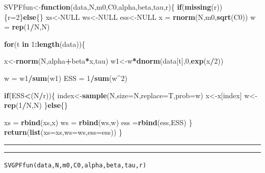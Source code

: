 \documentclass[
]{book}
\newenvironment{Shaded}{\begin{snugshade}}{\end{snugshade}}
\newcommand{\ControlFlowTok}[1]{\textcolor[rgb]{0.13,0.29,0.53}{\textbf{#1}}}
\newcommand{\DataTypeTok}[1]{\textcolor[rgb]{0.13,0.29,0.53}{#1}}
\newcommand{\DecValTok}[1]{\textcolor[rgb]{0.00,0.00,0.81}{#1}}
\newcommand{\KeywordTok}[1]{\textcolor[rgb]{0.13,0.29,0.53}{\textbf{#1}}}
\newcommand{\NormalTok}[1]{#1}
\newcommand{\OperatorTok}[1]{\textcolor[rgb]{0.81,0.36,0.00}{\textbf{#1}}}
\newcommand{\OtherTok}[1]{\textcolor[rgb]{0.56,0.35,0.01}{#1}}
\newcommand{\StringTok}[1]{\textcolor[rgb]{0.31,0.60,0.02}{#1}}
\theoremstyle{break}
\theoremstyle{nonumberplain}
\begin{document}
\begin{Shaded}
\begin{Highlighting}[]
\NormalTok{SVPFfun<-}\ControlFlowTok{function}\NormalTok{(data,N,m0,C0,alpha,beta,tau,r)\{}
  \ControlFlowTok{if}\NormalTok{(}\KeywordTok{missing}\NormalTok{(r))\{r=}\DecValTok{2}\NormalTok{\}}\ControlFlowTok{else}\NormalTok{\{\}}
\NormalTok{  xs<-}\OtherTok{NULL}
\NormalTok{  ws<-}\OtherTok{NULL}
\NormalTok{  ess<-}\OtherTok{NULL}
\NormalTok{  x  =}\StringTok{ }\KeywordTok{rnorm}\NormalTok{(N,m0,}\KeywordTok{sqrt}\NormalTok{(C0))}
\NormalTok{  w  =}\StringTok{ }\KeywordTok{rep}\NormalTok{(}\DecValTok{1}\OperatorTok{/}\NormalTok{N,N)}
  
  \ControlFlowTok{for}\NormalTok{(t }\ControlFlowTok{in} \DecValTok{1}\OperatorTok{:}\KeywordTok{length}\NormalTok{(data))\{}
    
\NormalTok{    x<-}\KeywordTok{rnorm}\NormalTok{(N,alpha}\OperatorTok{+}\NormalTok{beta}\OperatorTok{*}\NormalTok{x,tau)}
\NormalTok{    w1<-w}\OperatorTok{*}\KeywordTok{dnorm}\NormalTok{(data[t],}\DecValTok{0}\NormalTok{,}\KeywordTok{exp}\NormalTok{(x}\OperatorTok{/}\DecValTok{2}\NormalTok{))}
    
\NormalTok{    w =}\StringTok{ }\NormalTok{w1}\OperatorTok{/}\KeywordTok{sum}\NormalTok{(w1)}
\NormalTok{    ESS  =}\StringTok{ }\DecValTok{1}\OperatorTok{/}\KeywordTok{sum}\NormalTok{(w}\OperatorTok{^}\DecValTok{2}\NormalTok{)}
    
    \ControlFlowTok{if}\NormalTok{(ESS}\OperatorTok{<}\NormalTok{(N}\OperatorTok{/}\NormalTok{r))\{}
\NormalTok{      index<-}\KeywordTok{sample}\NormalTok{(N,}\DataTypeTok{size=}\NormalTok{N,}\DataTypeTok{replace=}\NormalTok{T,}\DataTypeTok{prob=}\NormalTok{w)}
\NormalTok{      x<-x[index]}
\NormalTok{      w<-}\KeywordTok{rep}\NormalTok{(}\DecValTok{1}\OperatorTok{/}\NormalTok{N,N)}
\NormalTok{    \}}\ControlFlowTok{else}\NormalTok{\{\}}
    
\NormalTok{    xs =}\StringTok{ }\KeywordTok{rbind}\NormalTok{(xs,x)}
\NormalTok{    ws =}\StringTok{ }\KeywordTok{rbind}\NormalTok{(ws,w)}
\NormalTok{    ess =}\KeywordTok{rbind}\NormalTok{(ess,ESS)}
\NormalTok{  \}}
  \KeywordTok{return}\NormalTok{(}\KeywordTok{list}\NormalTok{(}\DataTypeTok{xs=}\NormalTok{xs,}\DataTypeTok{ws=}\NormalTok{ws,}\DataTypeTok{ess=}\NormalTok{ess))}
\NormalTok{\}}
\end{Highlighting}
\end{Shaded}

\hrule
\hrule

\texttt{SVGPFfun(data,N,m0,C0,alpha,beta,tau,r)}\\
\end{document}
